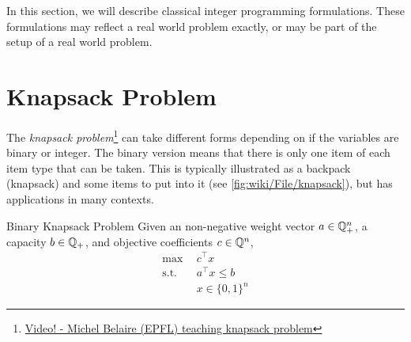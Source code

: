 In this section, we will describe classical integer programming formulations.     These formulations may reflect  a real world problem exactly, or may be part of the setup of a real world problem.   

\section{Knapsack Problem}
The \emph{knapsack problem}\footnote{\href{https://www.youtube.com/watch?v=GteOoMGUOdY}{Video! - Michel Belaire (EPFL) teaching knapsack problem}} can take different forms depending on if the variables are binary or integer.  The binary version means that there is only one item of each item type that can be taken.  This is typically illustrated as a backpack (knapsack) and some items to put into it (see  \autoref{fig:wiki/File/knapsack}), but has applications in many contexts.  




\begin{general}{Binary Knapsack Problem}{\npcomplete}
Given an non-negative weight vector $a \in {\mathbb{Q}}^n_+$, a capacity $b \in {\mathbb{Q}}_+$, and objective coefficients $c \in {\mathbb{Q}}^n$, 
\begin{equation}
\begin{split}
\max \ \ & c^\top x\\
\text{s.t.}\ \ & a^\top x \leq b\\
& x \in \{0,1\}^n
\end{split}
\end{equation}
\end{general}
 


 

